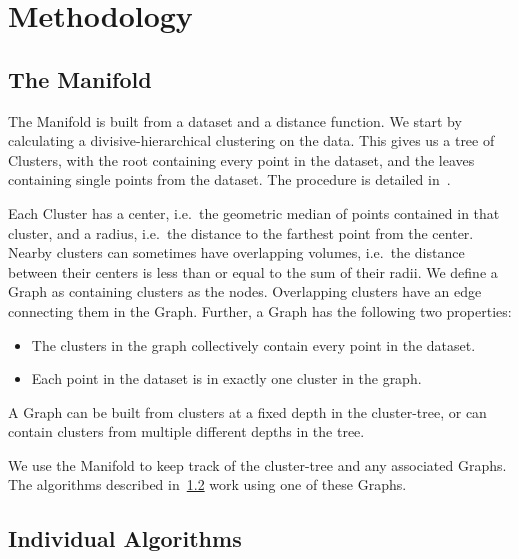 \section{Methodology}
\label{sec:methodology}

\subsection{The Manifold}
\label{subsec:methodology:manifold}

The Manifold is built from a dataset and a distance function.
We start by calculating a divisive-hierarchical clustering on the data.
This gives us a tree of Clusters, with the root containing every point in the dataset, and the leaves containing single points from the dataset.
The procedure is detailed in~\cite{ishaq2019entropy}.

Each Cluster has a center, i.e.\ the geometric median of points contained in that cluster, and a radius, i.e.\ the distance to the farthest point from the center.
Nearby clusters can sometimes have overlapping volumes, i.e.\ the distance between their centers is less than or equal to the sum of their radii.
We define a Graph as containing clusters as the nodes.
Overlapping clusters have an edge connecting them in the Graph.
Further, a Graph has the following two properties:
\begin{itemize}
    \item The clusters in the graph collectively contain every point in the dataset.
    \item Each point in the dataset is in exactly one cluster in the graph.
\end{itemize}
A Graph can be built from clusters at a fixed depth in the cluster-tree, or can contain clusters from multiple different depths in the tree.

We use the Manifold to keep track of the cluster-tree and any associated Graphs.
The algorithms described in~\ref{subsec:methodology:individual-algorithms} work using one of these Graphs.

\subsection{Individual Algorithms}
\label{subsec:methodology:individual-algorithms}


